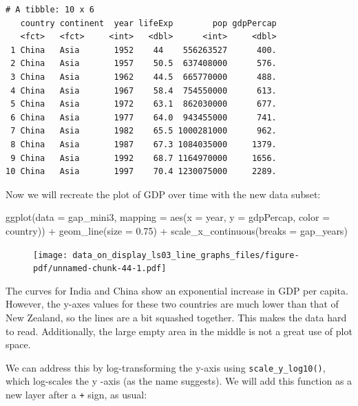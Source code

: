 \documentclass[
  letterpaper,
  DIV=11,
  numbers=noendperiod]{scrreprt}
\newenvironment{Shaded}{\begin{snugshade}}{\end{snugshade}}
\newcommand{\AttributeTok}[1]{\textcolor[rgb]{0.40,0.45,0.13}{#1}}
\newcommand{\FloatTok}[1]{\textcolor[rgb]{0.68,0.00,0.00}{#1}}
\newcommand{\FunctionTok}[1]{\textcolor[rgb]{0.28,0.35,0.67}{#1}}
\newcommand{\NormalTok}[1]{\textcolor[rgb]{0.00,0.23,0.31}{#1}}
\newcommand{\SpecialCharTok}[1]{\textcolor[rgb]{0.37,0.37,0.37}{#1}}
\begin{document}
\begin{verbatim}
# A tibble: 10 x 6
   country continent  year lifeExp        pop gdpPercap
   <fct>   <fct>     <int>   <dbl>      <int>     <dbl>
 1 China   Asia       1952    44    556263527      400.
 2 China   Asia       1957    50.5  637408000      576.
 3 China   Asia       1962    44.5  665770000      488.
 4 China   Asia       1967    58.4  754550000      613.
 5 China   Asia       1972    63.1  862030000      677.
 6 China   Asia       1977    64.0  943455000      741.
 7 China   Asia       1982    65.5 1000281000      962.
 8 China   Asia       1987    67.3 1084035000     1379.
 9 China   Asia       1992    68.7 1164970000     1656.
10 China   Asia       1997    70.4 1230075000     2289.
\end{verbatim}

Now we will recreate the plot of GDP over time with the new data subset:

\begin{Shaded}
\begin{Highlighting}[]
\FunctionTok{ggplot}\NormalTok{(}\AttributeTok{data =}\NormalTok{ gap\_mini3, }
       \AttributeTok{mapping =} \FunctionTok{aes}\NormalTok{(}\AttributeTok{x =}\NormalTok{ year, }
                     \AttributeTok{y =}\NormalTok{ gdpPercap, }
                     \AttributeTok{color =}\NormalTok{ country)) }\SpecialCharTok{+}
  \FunctionTok{geom\_line}\NormalTok{(}\AttributeTok{size =} \FloatTok{0.75}\NormalTok{) }\SpecialCharTok{+}
  \FunctionTok{scale\_x\_continuous}\NormalTok{(}\AttributeTok{breaks =}\NormalTok{ gap\_years)}
\end{Highlighting}
\end{Shaded}

\begin{figure}[H]

{\centering \texttt{[image: data\_on\_display\_ls03\_line\_graphs\_files/figure-pdf/unnamed-chunk-44-1.pdf]}

}

\end{figure}

The curves for India and China show an exponential increase in GDP per
capita. However, the y-axes values for these two countries are much
lower than that of New Zealand, so the lines are a bit squashed
together. This makes the data hard to read. Additionally, the large
empty area in the middle is not a great use of plot space.

We can address this by log-transforming the y-axis using
\texttt{scale\_y\_log10()}, which log-scales the y -axis (as the name
suggests). We will add this function as a new layer after a \texttt{+}
sign, as usual:
\end{document}
